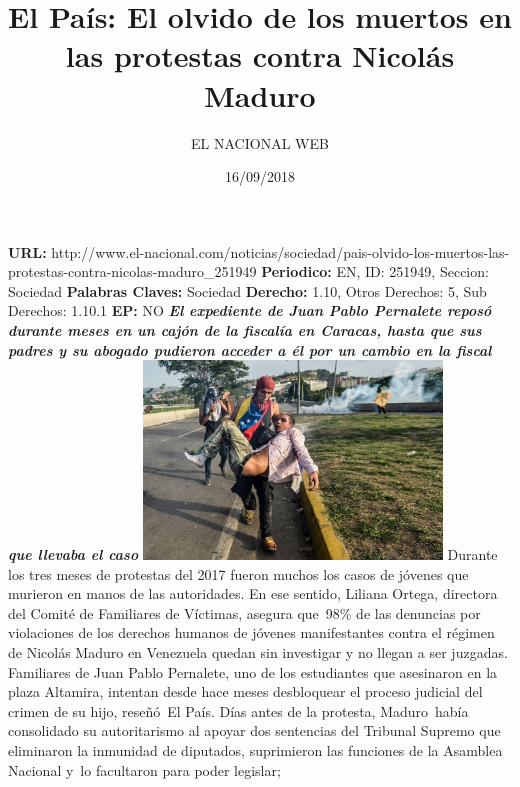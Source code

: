 \documentclass{article}%
\title{\textbf{El País: El olvido de los muertos en las protestas contra Nicolás Maduro}}%
\author{EL NACIONAL WEB}%
\date{16/09/2018}%
\begin{document}
%
\normalsize%
\maketitle%
\textbf{URL: }%
http://www.el{-}nacional.com/noticias/sociedad/pais{-}olvido{-}los{-}muertos{-}las{-}protestas{-}contra{-}nicolas{-}maduro\_251949\newline%
%
\textbf{Periodico: }%
EN, %
ID: %
251949, %
Seccion: %
Sociedad\newline%
%
\textbf{Palabras Claves: }%
Sociedad\newline%
%
\textbf{Derecho: }%
1.10, %
Otros Derechos: %
5, %
Sub Derechos: %
1.10.1\newline%
%
\textbf{EP: }%
NO\newline%
\newline%
%
\textbf{\textit{El expediente de Juan Pablo Pernalete reposó durante meses en un cajón de la fiscalía en Caracas, hasta que sus padres y su abogado pudieron acceder a él por un cambio en la fiscal que llevaba el caso}}%
\newline%
\newline%
%
\includegraphics[width=300px]{64.jpg}%
\newline%
%
Durante los tres meses de protestas del 2017 fueron muchos los casos de jóvenes que murieron en manos de las autoridades. En ese sentido, Liliana Ortega, directora del Comité de Familiares de Víctimas, asegura que~98\% de las denuncias por violaciones de los derechos humanos de jóvenes manifestantes contra el régimen de Nicolás Maduro en Venezuela quedan sin investigar y no llegan a ser juzgadas.%
\newline%
%
Familiares de Juan Pablo Pernalete, uno de los estudiantes que asesinaron en la plaza Altamira, intentan desde hace meses desbloquear el proceso judicial del crimen de su hijo, reseñó~El País.%
\newline%
%
Días antes de la protesta, Maduro~había consolidado su autoritarismo al apoyar dos sentencias del Tribunal Supremo que eliminaron la inmunidad de diputados, suprimieron las funciones de la Asamblea Nacional y~lo facultaron para poder legislar;%
\end{document}
